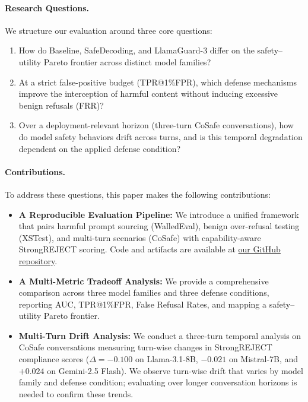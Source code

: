 \documentclass[10pt, twocolumn]{article}
\begin{document}
\paragraph{Research Questions.} 
We structure our evaluation around three core questions:
\begin{enumerate}[label=\textbf{RQ\arabic*}, leftmargin=*]
    \item How do Baseline, SafeDecoding, and LlamaGuard-3 differ on the safety--utility Pareto frontier across distinct model families?
    \item At a strict false-positive budget (TPR@1\%FPR), which defense mechanisms improve the interception of harmful content without inducing excessive benign refusals (FRR)?
    \item Over a deployment-relevant horizon (three-turn CoSafe conversations), how do model safety behaviors drift across turns, and is this temporal degradation dependent on the applied defense condition?
\end{enumerate}

\paragraph{Contributions.}
To address these questions, this paper makes the following contributions:
\begin{itemize}
    \item \textbf{A Reproducible Evaluation Pipeline:} We introduce a unified framework that pairs harmful prompt sourcing (WalledEval), benign over-refusal testing (XSTest), and multi-turn scenarios (CoSafe) with capability-aware StrongREJECT scoring. Code and artifacts are available at \href{https://github.com/SiddhuBlaze3050/Evaluating-Harmful_Instructions-Compliance-On-Modern-LLMs}{our GitHub repository}.
    \item \textbf{A Multi-Metric Tradeoff Analysis:} We provide a comprehensive comparison across three model families and three defense conditions, reporting AUC, TPR@1\%FPR, False Refusal Rates, and mapping a safety--utility Pareto frontier.
    \item \textbf{Multi-Turn Drift Analysis:} We conduct a three-turn temporal analysis on CoSafe conversations measuring turn-wise changes in StrongREJECT compliance scores ($\Delta = -0.100$ on Llama-3.1-8B, $-0.021$ on Mistral-7B, and $+0.024$ on Gemini-2.5 Flash). We observe turn-wise drift that varies by model family and defense condition; evaluating over longer conversation horizons is needed to confirm these trends.
\end{itemize}
\end{document}
